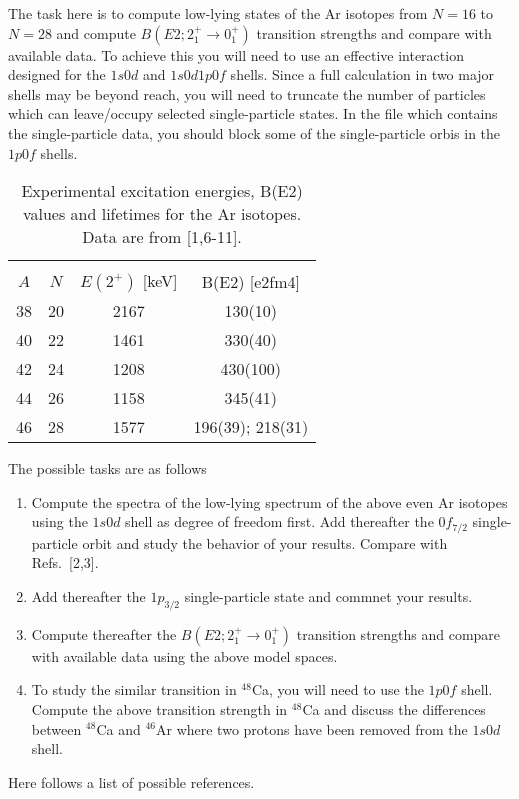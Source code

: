 \documentclass[prc]{revtex4}
\begin{document}
The task here is to compute low-lying states of the Ar isotopes from
$N=16$ to $N=28$ and compute $B(E2; 2^+_1\rightarrow 0^+_1)$
transition strengths and compare with available data. To achieve this
you will need to use an effective interaction designed for the $1s0d$
and $1s0d1p0f$ shells. Since a full calculation in two major shells
may be beyond reach, you will need to truncate the number of particles
which can leave/occupy selected single-particle states. In the file
which contains the single-particle data, you should block some of the
single-particle orbis in the $1p0f$ shells.
\begin{table}
\caption{Experimental excitation energies, B(E2) values and lifetimes for the Ar isotopes. Data
are from [1,6-11].}
\begin{tabular}{cccc} \hline\\
$A$ & $N$ & $E(2^+)$ [keV] & B(E2) [e2fm4] \\ \hline
38 &20 &2167& 130(10) \\
40 &22 &1461 &330(40) \\
42 &24 &1208 &430(100)\\
44 &26 &1158 &345(41)\\
46 &28 &1577 &196(39); 218(31)\\ \hline
\end{tabular}
\end{table}

The possible tasks are as follows
\begin{enumerate}
\item Compute the spectra  of the low-lying spectrum of the above even Ar isotopes using the $1s0d$ shell as degree of freedom first. Add thereafter the $0f_{7/2}$ single-particle orbit and study the behavior of your results. Compare with Refs.~[2,3]. 
\item Add thereafter the $1p_{3/2}$ single-particle state and commnet your results.
\item Compute thereafter the $B(E2; 2^+_1\rightarrow 0^+_1)$
transition strengths and compare with available data using the above model spaces. 
\item To study the similar transition in $^{48}$Ca, you will need to use the $1p0f$ shell. Compute the above transition strength in $^{48}$Ca and discuss the differences between $^{48}$Ca and $^{46}$Ar where two protons have been removed from the 
$1s0d$ shell.
\end{enumerate}



Here follows a list of possible references.
\end{document}
